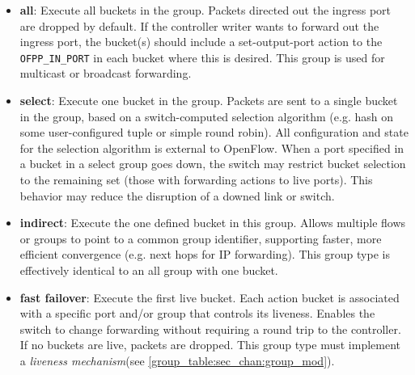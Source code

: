 \documentclass[10pt]{article}
\begin{document}
\begin{itemize}
\item \textbf{all}: Execute all buckets in the group.  Packets directed out the ingress port are dropped by default.  If the controller writer wants to forward out the ingress port, the bucket(s) should include a set-output-port action to the \verb|OFPP_IN_PORT| in each bucket where this is desired.  This group is used for multicast or broadcast forwarding.
\item \textbf{select}: Execute one bucket in the group.  Packets are sent to a single bucket in the group, based on a switch-computed selection algorithm (e.g. hash on some user-configured tuple or simple round robin).  All configuration and state for the selection algorithm is external to OpenFlow.  When a port specified in a bucket in a select group goes down, the switch may restrict bucket selection to the remaining set (those with forwarding actions to live ports). This behavior may reduce the disruption of a downed link or switch.
\item \textbf{indirect}: Execute the one defined bucket in this group.  Allows multiple flows or groups to point to a common group identifier, supporting faster, more efficient convergence (e.g. next hops for IP forwarding).  This group type is effectively identical to an all group with one bucket.
\item \textbf{fast failover}: Execute the first live bucket.  Each action bucket is associated with a specific port and/or group that controls its liveness.  Enables the switch to change forwarding without requiring a round trip to the controller.  If no buckets are live, packets are dropped. This group type must implement a \textit{liveness mechanism}(see \ref{group_table:sec_chan:group_mod}).
\end{itemize}
\end{document}
